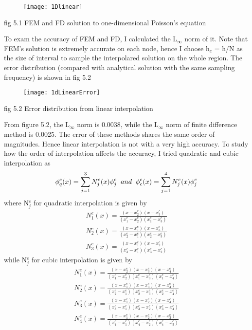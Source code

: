 \documentclass[journal]{IEEEtran}
\begin{document}
\begin{figure}[h]
	\centering
	\texttt{[image: 1Dlinear]}
\end{figure}
\begin{center}
	\small fig 5.1 FEM and FD solution to one-dimensional Poisson's equation
\end{center} 
To exam the accuracy of FEM and FD, I calculated the L$_\infty$ norm of it. Note that FEM's solution is extremely accurate on each node, hence I choose h$_e$ = h/N as the size of interval to sample the interpolared solution on the whole region. The error distribution (compared with analytical solution with the same sampling frequency) is shown in fig 5.2
\begin{figure}[h]
	\centering
	\texttt{[image: 1dLinearError]}
\end{figure}
\begin{center}
	\small fig 5.2 Error distribution from linear interpolation 
\end{center} 
From figure 5.2, the L$_\infty$ norm is 0.0038, while the L$_\infty$ norm of finite difference method is 0.0025. The error of these methods shares the same order of magnitudes. Hence linear interpolation is not with a very high accuracy. To study how the order of interpolation affects the accuracy, I tried quadratic and cubic interpolation as
\begin{equation}
\phi^e_{q}(x) = \sum_{j=1}^{3}N_j^e(x)\phi^e_j \hspace{0.2cm} and \hspace{0.2cm} \phi^e_{c}(x) = \sum_{j=1}^{4}N_j^e(x)\phi^e_j
\end{equation}
where N$^e_j$ for quadratic interpolation is given by
\begin{align*}
N^e_1(x) = \frac{(x-x^e_2)(x-x^e_3)}{(x^e_1-x^e_2)(x^e_1-x^e_3)} \\
N^e_2(x) = \frac{(x-x^e_1)(x-x^e_3)}{(x^e_2-x^e_1)(x^e_2-x^e_3)} \\
N^e_3(x) = \frac{(x-x^e_1)(x-x^e_2)}{(x^e_3-x^e_1)(x^e_3-x^e_2)}
\end{align*}
while N$^e_j$ for cubic interpolation is given by
\begin{align*}
N^e_1(x) = \frac{(x-x^e_2)(x-x^e_3)(x-x^e_4)}{(x^e_1-x^e_2)(x^e_1-x^e_3)(x^e_1-x^e_4)} \\
N^e_2(x) = \frac{(x-x^e_1)(x-x^e_3)(x-x^e_4)}{(x^e_2-x^e_1)(x^e_2-x^e_3)(x^e_2-x^e_4)} \\
N^e_3(x) = \frac{(x-x^e_1)(x-x^e_2)(x-x^e_4)}{(x^e_3-x^e_1)(x^e_3-x^e_2)(x^e_3-x^e_4)} \\
N^e_4(x) = \frac{(x-x^e_1)(x-x^e_2)(x-x^e_3)}{(x^e_4-x^e_1)(x^e_4-x^e_2)(x^e_4-x^e_3)}
\end{align*}
\end{document}
